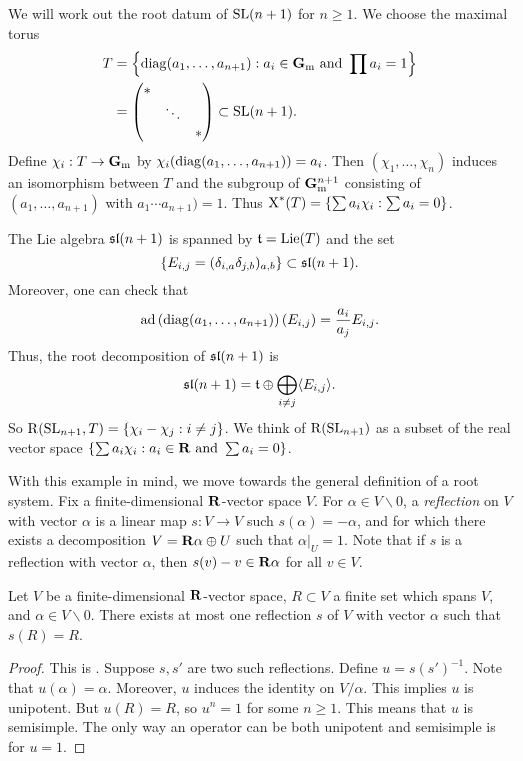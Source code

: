 \begin{example}
We will work out the root datum of $\operatorname{SL}(n+1)$ for $n\geqslant 1$. We choose 
the maximal torus 
\begin{align*}
  T &= \left\{\operatorname{diag}(a_1,\dots,a_{n+1}):a_i\in \mathbf{G}_\mathrm{m}\text{ and }\prod a_i=1\right\} \\
  &= \begin{pmatrix} \ast \\ & \ddots \\ & & \ast \end{pmatrix} \subset \operatorname{SL}(n+1) .
\end{align*}
Define $\chi_i:T\to \mathbf{G}_\mathrm{m}$ by $\chi_i(\operatorname{diag}(a_1,\dots,a_{n+1}))=a_i$. Then 
$(\chi_1,\dots,\chi_n)$ induces an isomorphism between $T$ and the subgroup of 
$\mathbf{G}_\mathrm{m}^{n+1}$ consisting of $(a_1,\dots,a_{n+1})$ with $a_1\dotsm a_{n+1})=1$. 
Thus $\operatorname{X}^\ast(T)=\{\sum a_i \chi_i:\sum a_i=0\}$. 

The Lie algebra $\mathfrak{sl}(n+1)$ is spanned by $\mathfrak{t}=\operatorname{Lie}(T)$ and the set 
\[
  \left\{E_{i,j} = (\delta_{i,a}\delta_{j,b})_{a,b}\right\} \subset \mathfrak{sl}(n+1) .
\]
Moreover, one can check that 
\[
  \operatorname{ad}\left(\operatorname{diag}(a_1,\dots,a_{n+1})\right)(E_{i,j}) = \frac{a_i}{a_j} E_{i,j} .
\]
Thus, the root decomposition of $\mathfrak{sl}(n+1)$ is 
\[
  \mathfrak{sl}(n+1) = \mathfrak{t}\oplus \bigoplus_{i\ne j} \langle E_{i,j}\rangle .
\]
So $\operatorname{R}(\operatorname{SL}_{n+1},T) = \{\chi_i-\chi_j:i\ne j\}$. We think 
of $\operatorname{R}(\operatorname{SL}_{n+1})$ as a subset of the real vector space 
$\{\sum a_i \chi_i:a_i\in \mathbf{R}\text{ and }\sum a_i=0\}$. 
\end{example}

With this example in mind, we move towards the general definition of a root 
system. Fix a finite-dimensional $\mathbf{R}$-vector space $V$. For 
$\alpha\in V\smallsetminus 0$, a \emph{reflection} on $V$ with vector $\alpha$ 
is a linear map $s:V\to V$ such $s(\alpha)=-\alpha$, and for which there exists 
a decomposition $V=\mathbf{R}\alpha\oplus U$ such that $\alpha|_U=1$. Note that if 
$s$ is a reflection with vector $\alpha$, then $s(v)-v\in \mathbf{R}\alpha$ for all 
$v\in V$. 

\begin{lemma}
Let $V$ be a finite-dimensional $\mathbf{R}$-vector space, $R\subset V$ a finite 
set which spans $V$, and $\alpha\in V\smallsetminus 0$. There exists at most 
one reflection $s$ of $V$ with vector $\alpha$ such that $s(R)=R$. 
\end{lemma}
\begin{proof}
This is \cite[VI \S 1.1 lem.1]{bourbaki-lie-alg-4-6}. 
Suppose $s,s'$ are two such reflections. Define $u=s (s')^{-1}$. Note that 
$u(\alpha)=\alpha$. Moreover, $u$ induces the identity on $V/\alpha$. This 
implies $u$ is unipotent. But $u(R)=R$, so $u^n=1$ for some $n\geqslant 1$. 
This means that $u$ is semisimple. The only way an operator can be both 
unipotent and semisimple is for $u=1$. 
\end{proof}

